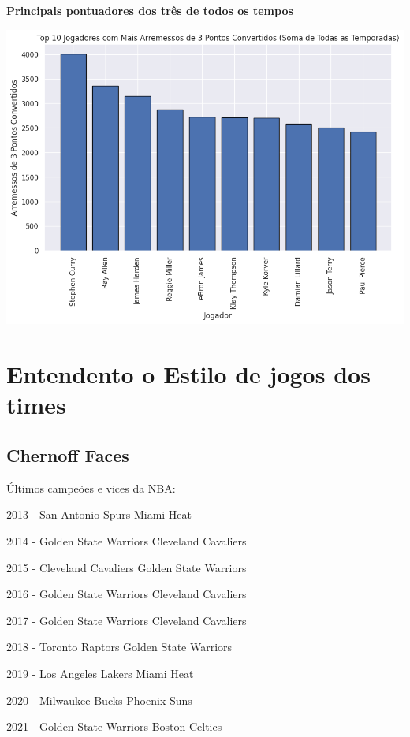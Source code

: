 \documentclass[
]{book}
\begin{document}
\textbf{Principais pontuadores dos três de todos os tempos}

\includegraphics{imagens/19.png}

\hypertarget{entendento-o-estilo-de-jogos-dos-times}{%
\chapter{Entendento o Estilo de jogos dos times}\label{entendento-o-estilo-de-jogos-dos-times}}

\hypertarget{chernoff-faces}{%
\section{Chernoff Faces}\label{chernoff-faces}}

Últimos campeões e vices da NBA:

2013 - San Antonio Spurs \textbar{} Miami Heat

2014 - Golden State Warriors \textbar{} Cleveland Cavaliers

2015 - Cleveland Cavaliers \textbar{} Golden State Warriors

2016 - Golden State Warriors \textbar{} Cleveland Cavaliers

2017 - Golden State Warriors \textbar{} Cleveland Cavaliers

2018 - Toronto Raptors \textbar{} Golden State Warriors

2019 - Los Angeles Lakers \textbar{} Miami Heat

2020 - Milwaukee Bucks \textbar{} Phoenix Suns

2021 - Golden State Warriors \textbar{} Boston Celtics
\end{document}
